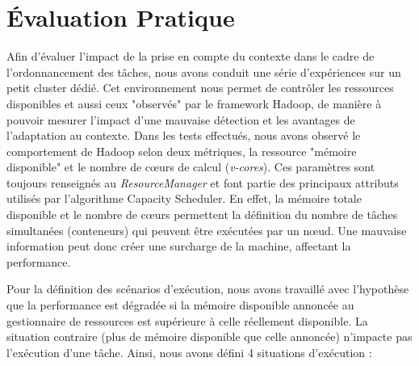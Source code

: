 \section{Évaluation Pratique} \label{sec:exper}

Afin d'évaluer l'impact de la prise en compte du contexte dans le cadre de l'ordonnancement des tâches, nous avons conduit une série d'expériences sur un petit cluster dédié. Cet environnement nous permet de contrôler les ressources disponibles et aussi ceux "observés" par le framework Hadoop, de manière à pouvoir mesurer l'impact d'une mauvaise détection et les avantages de l'adaptation au contexte. Dans les tests effectués, nous avons observé le comportement de Hadoop selon deux métriques, la ressource "mémoire disponible" et le nombre de c{\oe}urs de calcul (\textit{v-cores}). Ces paramètres sont toujours renseignés au \textit{ResourceManager} et font partie des principaux attributs utilisés par l'algorithme Capacity Scheduler. En effet, la mémoire totale disponible et le nombre de c{\oe}urs permettent la définition du nombre de tâches simultanées (conteneurs) qui peuvent être exécutées par un n{\oe}ud. Une mauvaise information peut donc créer une surcharge de la machine, affectant la performance.  

Pour la définition des scénarios d'exécution, nous avons travaillé avec l'hypothèse que la performance est dégradée si la mémoire disponible annoncée au gestionnaire de ressources est supérieure à celle réellement disponible. La situation contraire (plus de mémoire disponible que celle annoncée) n'impacte pas l'exécution d'une tâche. Ainsi, nous avons défini 4 situations d'exécution :

